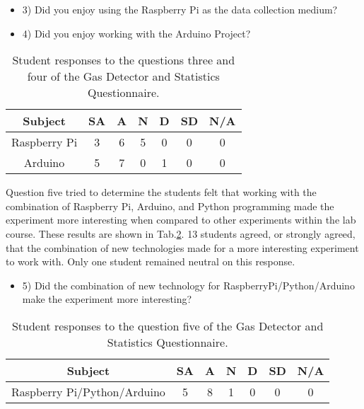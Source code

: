 \begin{table}[htpb]
  \scriptsize
  \begin{center}
    \caption{\scriptsize Student responses to the questions three and four of the Gas Detector and Statistics Questionnaire.}
    \label{tab:t7q34}
    \begin{itemize}
    \item 3) Did you enjoy using the Raspberry Pi as the data collection medium?
    \item 4) Did you enjoy working with the Arduino Project?
    \end{itemize}
    

    \begin{tabular}{|c | c | c | c | c | c | c|}
      \hline
      Subject & SA & A & N & D & SD & N/A\\
      \hline
      Raspberry Pi & 3 & 6 & 5 & 0 & 0 & 0\\
      \hline
      Arduino & 5 & 7 & 0 & 1 & 0 & 0\\
      \hline
    \end{tabular}
  \end{center}%
\end{table}

Question five tried to determine the students felt that working with the combination of Raspberry Pi, Arduino, and Python programming made the experiment more interesting when compared to other experiments within the lab course.
These results are shown in Tab.\ref{tab:t7q5}.
13 students agreed, or strongly agreed, that the combination of new technologies made for a more interesting experiment to work with.
Only one student remained neutral on this response.

\begin{table}[htpb]
  \scriptsize
  \begin{center}
    \caption{\scriptsize Student responses to the question five of the Gas Detector and Statistics Questionnaire.}
    \label{tab:t7q5}
    \begin{itemize}
    \item  5) Did the combination of new technology for RaspberryPi/Python/Arduino make the experiment more interesting?
    \end{itemize}
    

    \begin{tabular}{|c | c | c | c | c | c | c|}
      \hline
      Subject & SA & A & N & D & SD & N/A\\
      \hline
      Raspberry Pi/Python/Arduino & 5 & 8 & 1 & 0 & 0 & 0\\
      \hline
    \end{tabular}
  \end{center}%
\end{table}

